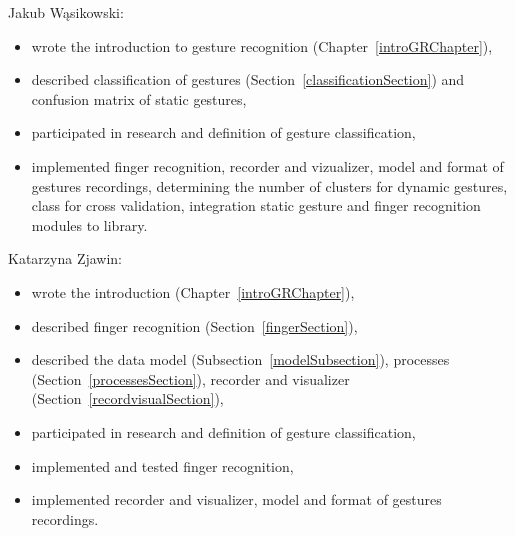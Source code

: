 Jakub Wąsikowski:
\begin {itemize}
\item wrote the introduction to gesture recognition (Chapter~\ref{introGRChapter}),
\item described classification of gestures (Section~\ref{classificationSection}) and confusion matrix of static gestures,
\item participated in research and definition of gesture classification,
\item implemented finger recognition, recorder and vizualizer, model and format of gestures recordings, determining the number of clusters for dynamic gestures, class for cross validation, integration static gesture and finger recognition modules to library.
\end{itemize}

Katarzyna Zjawin: 
\begin{itemize}
\item wrote the introduction (Chapter~\ref{introGRChapter}),
\item described finger recognition (Section~\ref{fingerSection}),
\item described the data model (Subsection~\ref{modelSubsection}), processes (Section~\ref{processesSection}), recorder and visualizer (Section~\ref{recordvisualSection}),
\item participated in research and definition of gesture classification,
\item implemented and tested finger recognition,
\item implemented recorder and visualizer, model and format of gestures recordings.
\end{itemize}


